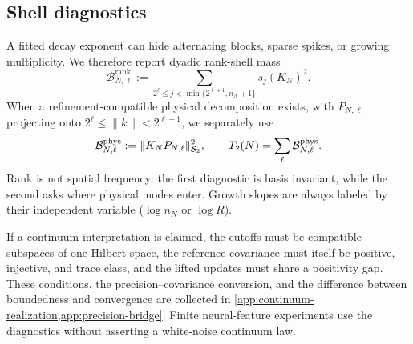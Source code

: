 \subsection{Shell diagnostics}

A fitted decay exponent can hide alternating blocks, sparse spikes, or growing
multiplicity. We therefore report dyadic rank-shell mass
\begin{equation}
  \mathcal B^{\mathrm{rank}}_{N,\ell}
  :=\sum_{2^\ell\le j<\min\{2^{\ell+1},n_N+1\}}s_j(K_N)^2.
  \label{eq:rank-shell-mass}
\end{equation}
When a refinement-compatible physical decomposition exists, with
$P_{N,\ell}$ projecting onto
$2^\ell\le\lVert k\rVert<2^{\ell+1}$, we separately use
\begin{equation}
  \mathcal B^{\mathrm{phys}}_{N,\ell}
  :=\lVert K_NP_{N,\ell}\rVert_{\mathcal{S}_{2}}^2,
  \qquad
  T_2(N)=\sum_\ell\mathcal B^{\mathrm{phys}}_{N,\ell}.
  \label{eq:physical-shell-mass}
\end{equation}
Rank is not spatial frequency: the first diagnostic is basis invariant, while
the second asks where physical modes enter. Growth slopes are always labeled by
their independent variable ($\log n_N$ or $\log R$).

If a continuum interpretation is claimed, the cutoffs must be compatible
subspaces of one Hilbert space, the reference covariance must itself be
positive, injective, and trace class, and the lifted updates must share a
positivity gap. These conditions, the precision--covariance conversion, and the
difference between boundedness and convergence are collected in
\cref{app:continuum-realization,app:precision-bridge}. Finite neural-feature
experiments use the diagnostics without asserting a white-noise continuum law.
